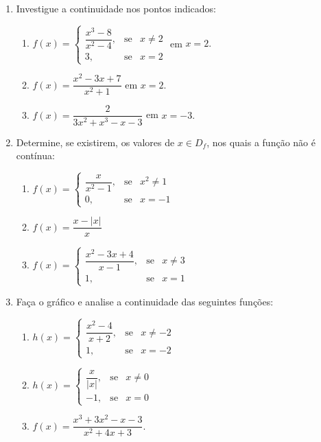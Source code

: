 \begin{enumerate}
\item Investigue a continuidade nos pontos indicados:
\begin{enumerate}
 \item $ f(x) =\left\{\begin{array}{rcl}
\dfrac{x^3- 8}{ x^2 -4},& \mbox{se}& x \ne2\\
 3,& \mbox{se}& x = 2
\end{array}
\right.$ em $x = 2.$

\item $ f(x) = \dfrac{x^2 - 3x + 7}{ x^2 + 1}$ em $x =
2.$ \item $ f(x) = \dfrac{2}{ 3x^2 + x^3 - x - 3}$ em
$x = -3.$
\end{enumerate}

\item Determine, se existirem, os valores de $x \in
D_f$, nos quais a função não é contínua:
\begin{enumerate}
\item $f(x) = \left\{\begin{array}{rcl} \dfrac{x}{ x^2
- 1},& \mbox{se}& x^2 \ne 1\\
 0 ,& \mbox{se}& x=-1
\end{array} \right.$
\item $f(x) = \dfrac{x -|x|}{ x}$ 
\item $f(x)
=  \left\{\begin{array}{rcl}\dfrac{ x^2 -3x +
4}{ x - 1} ,& \mbox{se}& x \ne 3\\
 1,& \mbox{se}& x = 1
 \end{array} \right.$
\end{enumerate}

\item Faça o gráfico e analise a continuidade das seguintes
funções:
\begin{enumerate}
 \item $ h(x) =
\left\{\begin{array}{rcl} \dfrac{x^2 - 4}{ x + 2} ,&
\mbox{se}&x \ne -2\\
1,& \mbox{se}& x = -2\end{array} \right.$ \item $h(x) =
\left\{\begin{array}{rcl} \dfrac{x}{|x|},&
\mbox{se}&x \ne 0\\
 -1,& \mbox{se}& x = 0\end{array}
\right.$ \item $f(x) =
\dfrac{x^3 + 3x^2 - x - 3}{ x^2 + 4x + 3}.$
\end{enumerate}




\end{enumerate}
